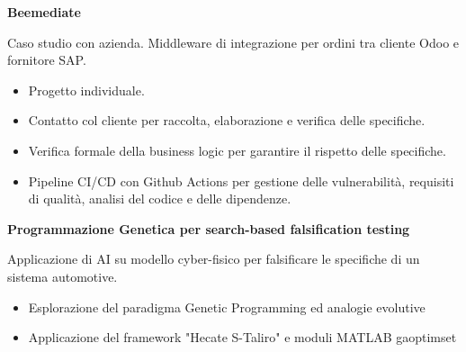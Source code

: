 \documentclass[a4paper]{letter}
\begin{document}
\begin{minipage}[t]{0.65\textwidth}
\vspace{1 mm}
{\large \textbf{Beemediate}}

{\small Caso studio con azienda. Middleware di integrazione per ordini tra cliente Odoo e fornitore SAP.}

\vspace{1 mm}
\begin{itemize}
    \item Progetto individuale.
    \item Contatto col cliente per raccolta, elaborazione e verifica delle specifiche.
    \item Verifica formale della business logic per garantire il rispetto delle specifiche.
    \item Pipeline CI/CD con Github Actions per gestione delle vulnerabilità, requisiti di qualità, analisi del codice e delle dipendenze.
\end{itemize}

\vspace{1 mm}
{\large \textbf{Programmazione Genetica per search-based falsification testing}}

{\small Applicazione di AI su modello cyber-fisico per falsificare le specifiche di un sistema automotive. }

\vspace{1 mm}
\begin{itemize}
    \item Esplorazione del paradigma Genetic Programming ed analogie evolutive
    \item Applicazione del framework "Hecate S-Taliro" e moduli MATLAB gaoptimset
\end{itemize}

\end{minipage}
\end{document}
